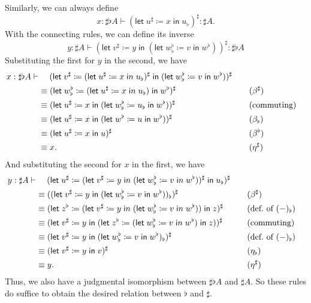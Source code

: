 \documentclass{amsart}
\def\flet#1:=#2in{\mathsf{let}\;#1 \coloneqq #2\;\mathsf{in}\;}
\begin{document}
Similarly, we can always define
\[ x : \sharp\flat A \vdash (\flet u^\sharp := x in u_\flat)^\sharp : \sharp A. \]
With the connecting rules, we can define its inverse
\[ y : \sharp A \vdash (\flet v^\sharp := y in (\flet w^\flat_\flat := v in w^\flat))^\sharp : \sharp\flat A\]
Substituting the first for $y$ in the second, we have
\begin{alignat*}{2}
  x:\sharp\flat A \vdash &\hspace{3ex} (\flet v^\sharp := (\flet u^\sharp := x in u_\flat)^\sharp in (\flet w^\flat_\flat := v in w^\flat))^\sharp\\
  &\equiv (\flet w^\flat_\flat := (\flet u^\sharp := x in u_\flat) in w^\flat)^\sharp
  &&\quad (\beta^\sharp)\\
  &\equiv (\flet u^\sharp := x in (\flet w^\flat_\flat := u_\flat in w^\flat))^\sharp
  &&\quad \text{(commuting)}\\
  &\equiv (\flet u^\sharp := x in (\flet w^\flat := u in w^\flat))^\sharp
  &&\quad (\beta_\flat)\\
  &\equiv (\flet u^\sharp := x in u)^\sharp
  &&\quad (\beta^\flat)\\
  &\equiv x.
  &&\quad (\eta^\sharp)
\end{alignat*}
And substituting the second for $x$ in the first, we have
\begin{alignat*}{2}
  y : \sharp A \vdash&\hspace{3ex} (\flet u^\sharp := (\flet v^\sharp := y in (\flet w^\flat_\flat := v in w^\flat))^\sharp in u_\flat)^\sharp\\
  &\equiv ((\flet v^\sharp := y in (\flet w^\flat_\flat := v in w^\flat))_\flat)^\sharp
  &&\quad (\beta^\sharp)\\
  &\equiv (\flet z^\flat := (\flet v^\sharp := y in (\flet w^\flat_\flat := v in w^\flat)) in z)^\sharp
  &&\quad \text{(def.~of } (-)_\flat)\\
  &\equiv (\flet v^\sharp := y in (\flet z^\flat := (\flet w^\flat_\flat := v in w^\flat) in z))^\sharp
  &&\quad \text{(commuting)}\\
  &\equiv (\flet v^\sharp := y in (\flet w^\flat_\flat := v in w^\flat)_\flat)^\sharp
  &&\quad \text{(def.~of } (-)_\flat)\\
  &\equiv (\flet v^\sharp := y in v)^\sharp
  &&\quad (\eta_\flat)\\
  &\equiv y.
  &&\quad (\eta^\sharp)
\end{alignat*}
Thus, we also have a judgmental isomorphism between $\sharp\flat A$ and $\sharp A$.
So these rules do suffice to obtain the desired relation between $\flat$ and $\sharp$.
\end{document}
